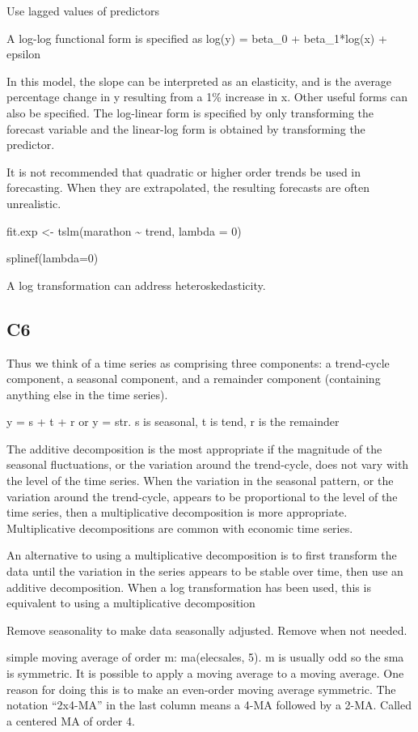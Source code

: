 \documentclass[]{book}
\begin{document}
Use lagged values of predictors

A log-log functional form is specified as log(y) = beta\_0 +
beta\_1*log(x) + epsilon

In this model, the slope can be interpreted as an elasticity, and is the
average percentage change in y resulting from a 1\% increase in x. Other
useful forms can also be specified. The log-linear form is specified by
only transforming the forecast variable and the linear-log form is
obtained by transforming the predictor.

It is not recommended that quadratic or higher order trends be used in
forecasting. When they are extrapolated, the resulting forecasts are
often unrealistic.

fit.exp \textless{}- tslm(marathon \textasciitilde{} trend, lambda = 0)

splinef(lambda=0)

A log transformation can address heteroskedasticity.

\subsection{C6}\label{c6}

Thus we think of a time series as comprising three components: a
trend-cycle component, a seasonal component, and a remainder component
(containing anything else in the time series).

y = s + t + r or y = str. s is seasonal, t is tend, r is the remainder

The additive decomposition is the most appropriate if the magnitude of
the seasonal fluctuations, or the variation around the trend-cycle, does
not vary with the level of the time series. When the variation in the
seasonal pattern, or the variation around the trend-cycle, appears to be
proportional to the level of the time series, then a multiplicative
decomposition is more appropriate. Multiplicative decompositions are
common with economic time series.

An alternative to using a multiplicative decomposition is to first
transform the data until the variation in the series appears to be
stable over time, then use an additive decomposition. When a log
transformation has been used, this is equivalent to using a
multiplicative decomposition

Remove seasonality to make data seasonally adjusted. Remove when not
needed.

simple moving average of order m: ma(elecsales, 5). m is usually odd so
the sma is symmetric. It is possible to apply a moving average to a
moving average. One reason for doing this is to make an even-order
moving average symmetric. The notation ``2x4-MA'' in the last column
means a 4-MA followed by a 2-MA. Called a centered MA of order 4.
\end{document}
